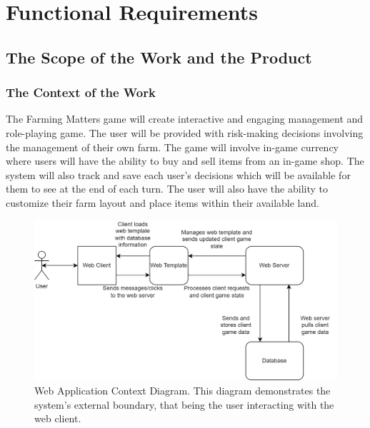 \documentclass{article}
\begin{document}
\section{Functional Requirements}

\subsection{The Scope of the Work and the Product}

\subsubsection{The Context of the Work}
The Farming Matters game will create interactive and engaging management and role-playing game. The user will be provided with risk-making decisions involving the management of their own farm. The game will involve in-game currency where users will have the ability to buy and sell items from an in-game shop. The system will also track and save each user's decisions which will be available for them to see at the end of each turn. The user will also have the ability to customize their farm layout and place items within their available land. 

\begin{figure}[!htb]
    \centering
    \includegraphics[width=14cm]{context.png}
    \caption{Web Application Context Diagram. This diagram demonstrates the system's external boundary, that being the user interacting with the web client.}
    \label{fig:context_diagram}
\end{figure}
\newpage
\end{document}
